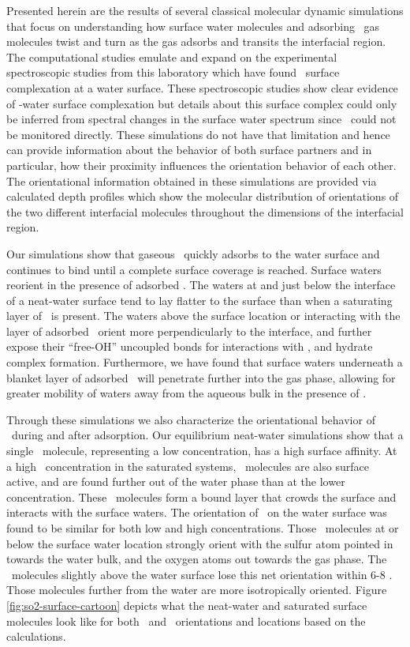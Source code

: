 \documentclass{article}
\begin{document}
Presented herein are the results of several classical molecular dynamic simulations that focus on understanding how surface water molecules and adsorbing \suldiox~gas molecules twist and turn as the gas adsorbs and transits the interfacial region. The computational studies emulate and expand on the experimental spectroscopic studies from this laboratory which have found \suldiox~surface complexation at a water surface.\cite{Tarbuck2005,Tarbuck2006,Ota2011}  These spectroscopic studies show clear evidence of \suldiox-water surface complexation but details about this surface complex could only be inferred from spectral changes in the surface water spectrum since \suldiox~could not be monitored directly.   These simulations do not have that limitation and hence can provide information about the behavior of both surface partners and in particular, how their proximity influences the orientation behavior of each other.  The orientational information obtained in these simulations are provided via calculated depth profiles which show the molecular distribution of orientations of the two different interfacial molecules throughout the dimensions of the interfacial region.

Our simulations show that gaseous \suldiox~quickly adsorbs to the water surface and continues to bind until a complete surface coverage is reached. Surface waters reorient in the presence of adsorbed \suldiox. The waters at and just below the interface of a neat-water surface tend to lay flatter to the surface than when a saturating layer of \suldiox~is present. The waters above the surface location or interacting with the layer of adsorbed \suldiox~orient more perpendicularly to the interface, and further expose their ``free-OH'' uncoupled bonds for interactions with \suldiox, and hydrate complex formation. Furthermore, we have found that surface waters underneath a blanket layer of adsorbed \suldiox~will penetrate further into the gas phase, allowing for greater mobility of waters away from the aqueous bulk in the presence of \suldiox.

Through these simulations we also characterize the orientational behavior of \suldiox~during and after adsorption. Our equilibrium neat-water simulations show that a single \suldiox~molecule, representing a low concentration, has a high surface affinity. At a high \suldiox~concentration in the saturated systems, \suldiox~molecules are also surface active, and are found further out of the water phase than at the lower concentration. These \suldiox~molecules form a bound layer that crowds the surface and interacts with the surface waters. The orientation of \suldiox~on the water surface was found to be similar for both low and high concentrations. Those \suldiox~molecules at or below the surface water location strongly orient with the sulfur atom pointed in towards the water bulk, and the oxygen atoms out towards the gas phase. The \suldiox~molecules slightly above the water surface lose this net orientation within 6-8 \angs. Those  molecules further from the water are more isotropically oriented. Figure \ref{fig:so2-surface-cartoon} depicts what the neat-water and saturated surface molecules look like for both \suldiox~and \wat~orientations and locations based on the calculations.
\end{document}
